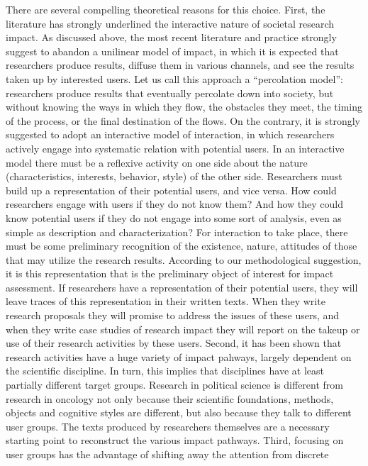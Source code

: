 \documentclass[]{book}
\begin{document}
There are several compelling theoretical reasons for this choice. First,
the literature has strongly underlined the interactive nature of
societal research impact. As discussed above, the most recent literature
and practice strongly suggest to abandon a unilinear model of impact, in
which it is expected that researchers produce results, diffuse them in
various channels, and see the results taken up by interested users. Let
us call this approach a ``percolation model'': researchers produce
results that eventually percolate down into society, but without knowing
the ways in which they flow, the obstacles they meet, the timing of the
process, or the final destination of the flows. On the contrary, it is
strongly suggested to adopt an interactive model of interaction, in
which researchers actively engage into systematic relation with
potential users. In an interactive model there must be a reflexive
activity on one side about the nature (characteristics, interests,
behavior, style) of the other side. Researchers must build up a
representation of their potential users, and vice versa. How could
researchers engage with users if they do not know them? And how they
could know potential users if they do not engage into some sort of
analysis, even as simple as description and characterization? For
interaction to take place, there must be some preliminary recognition of
the existence, nature, attitudes of those that may utilize the research
results. According to our methodological suggestion, it is this
representation that is the preliminary object of interest for impact
assessment. If researchers have a representation of their potential
users, they will leave traces of this representation in their written
texts. When they write research proposals they will promise to address
the issues of these users, and when they write case studies of research
impact they will report on the takeup or use of their research
activities by these users. Second, it has been shown that research
activities have a huge variety of impact pahways, largely dependent on
the scientific discipline. In turn, this implies that disciplines have
at least partially different target groups. Research in political
science is different from research in oncology not only because their
scientific foundations, methods, objects and cognitive styles are
different, but also because they talk to different user groups. The
texts produced by researchers themselves are a necessary starting point
to reconstruct the various impact pathways. Third, focusing on user
groups has the advantage of shifting away the attention from discrete
\end{document}
